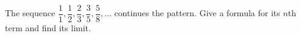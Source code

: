 The sequence $\dfrac11,\dfrac12,\dfrac23,\dfrac35,\dfrac58,\dots$ continues the pattern. Give a formula for its $n$th term and find its limit.
